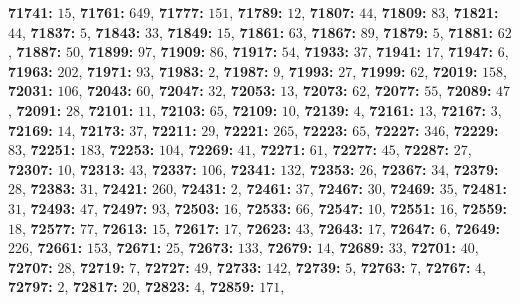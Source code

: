 \textsf{\bfseries 71741:} $15$, \textsf{\bfseries 71761:} $649$, \textsf{\bfseries 71777:} $151$, \textsf{\bfseries 71789:} $12$, \textsf{\bfseries 71807:} $44$, \textsf{\bfseries 71809:} $83$, \textsf{\bfseries 71821:} $44$, \textsf{\bfseries 71837:} $5$, \textsf{\bfseries 71843:} $33$, \textsf{\bfseries 71849:} $15$, \textsf{\bfseries 71861:} $63$, \textsf{\bfseries 71867:} $89$, \textsf{\bfseries 71879:} $5$, \textsf{\bfseries 71881:} $62$, \textsf{\bfseries 71887:} $50$, \textsf{\bfseries 71899:} $97$, \textsf{\bfseries 71909:} $86$, \textsf{\bfseries 71917:} $54$, \textsf{\bfseries 71933:} $37$, \textsf{\bfseries 71941:} $17$, \textsf{\bfseries 71947:} $6$, \textsf{\bfseries 71963:} $202$, \textsf{\bfseries 71971:} $93$, \textsf{\bfseries 71983:} $2$, \textsf{\bfseries 71987:} $9$, \textsf{\bfseries 71993:} $27$, \textsf{\bfseries 71999:} $62$, \textsf{\bfseries 72019:} $158$, \textsf{\bfseries 72031:} $106$, \textsf{\bfseries 72043:} $60$, \textsf{\bfseries 72047:} $32$, \textsf{\bfseries 72053:} $13$, \textsf{\bfseries 72073:} $62$, \textsf{\bfseries 72077:} $55$, \textsf{\bfseries 72089:} $47$, \textsf{\bfseries 72091:} $28$, \textsf{\bfseries 72101:} $11$, \textsf{\bfseries 72103:} $65$, \textsf{\bfseries 72109:} $10$, \textsf{\bfseries 72139:} $4$, \textsf{\bfseries 72161:} $13$, \textsf{\bfseries 72167:} $3$, \textsf{\bfseries 72169:} $14$, \textsf{\bfseries 72173:} $37$, \textsf{\bfseries 72211:} $29$, \textsf{\bfseries 72221:} $265$, \textsf{\bfseries 72223:} $65$, \textsf{\bfseries 72227:} $346$, \textsf{\bfseries 72229:} $83$, \textsf{\bfseries 72251:} $183$, \textsf{\bfseries 72253:} $104$, \textsf{\bfseries 72269:} $41$, \textsf{\bfseries 72271:} $61$, \textsf{\bfseries 72277:} $45$, \textsf{\bfseries 72287:} $27$, \textsf{\bfseries 72307:} $10$, \textsf{\bfseries 72313:} $43$, \textsf{\bfseries 72337:} $106$, \textsf{\bfseries 72341:} $132$, \textsf{\bfseries 72353:} $26$, \textsf{\bfseries 72367:} $34$, \textsf{\bfseries 72379:} $28$, \textsf{\bfseries 72383:} $31$, \textsf{\bfseries 72421:} $260$, \textsf{\bfseries 72431:} $2$, \textsf{\bfseries 72461:} $37$, \textsf{\bfseries 72467:} $30$, \textsf{\bfseries 72469:} $35$, \textsf{\bfseries 72481:} $31$, \textsf{\bfseries 72493:} $47$, \textsf{\bfseries 72497:} $93$, \textsf{\bfseries 72503:} $16$, \textsf{\bfseries 72533:} $66$, \textsf{\bfseries 72547:} $10$, \textsf{\bfseries 72551:} $16$, \textsf{\bfseries 72559:} $18$, \textsf{\bfseries 72577:} $77$, \textsf{\bfseries 72613:} $15$, \textsf{\bfseries 72617:} $17$, \textsf{\bfseries 72623:} $43$, \textsf{\bfseries 72643:} $17$, \textsf{\bfseries 72647:} $6$, \textsf{\bfseries 72649:} $226$, \textsf{\bfseries 72661:} $153$, \textsf{\bfseries 72671:} $25$, \textsf{\bfseries 72673:} $133$, \textsf{\bfseries 72679:} $14$, \textsf{\bfseries 72689:} $33$, \textsf{\bfseries 72701:} $40$, \textsf{\bfseries 72707:} $28$, \textsf{\bfseries 72719:} $7$, \textsf{\bfseries 72727:} $49$, \textsf{\bfseries 72733:} $142$, \textsf{\bfseries 72739:} $5$, \textsf{\bfseries 72763:} $7$, \textsf{\bfseries 72767:} $4$, \textsf{\bfseries 72797:} $2$, \textsf{\bfseries 72817:} $20$, \textsf{\bfseries 72823:} $4$, \textsf{\bfseries 72859:} $171$, 

